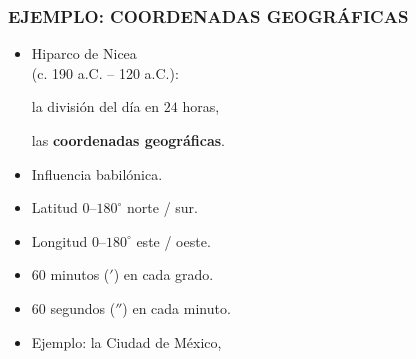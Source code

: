 \begin{frame}
  \frametitle{EJEMPLO: COORDENADAS GEOGRÁFICAS}

  \begin{minipage}[t][0.8\textheight]{0.6\textwidth}
    \vspace{0pt}
    \begin{itemize}
    \item<2-> Hiparco de Nicea \\
      (c. 190 a.C. -- 120 a.C.):

      la división del día en $24$ horas,

      las \textbf{coordenadas geográficas}.

    \item<3-> Influencia babilónica.

    \item<4-> Latitud $0$--$180^\circ$ norte / sur.

    \item<5-> Longitud $0$--$180^\circ$ este / oeste.

    \item<6-> $60$ minutos (${}'$) en cada grado.

    \item<7-> $60$ segundos (${}''$) en cada minuto.

    \item<8-> Ejemplo: la Ciudad de México,


\end{itemize}
\end{minipage}
\end{frame}
